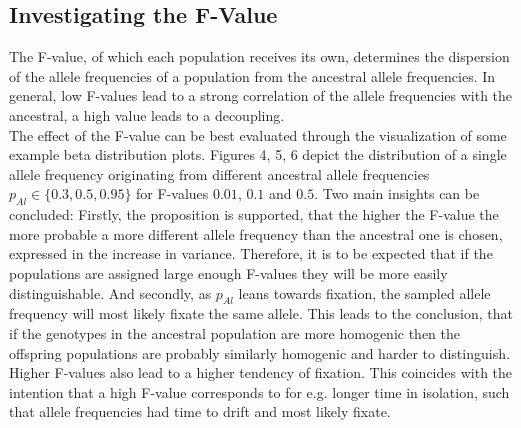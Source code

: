 \documentclass[a4paper, 11pt]{article}
\begin{document}
\subsection{Investigating the F-Value}
The F-value, of which each population receives its own, determines the dispersion of the allele frequencies of a population from the ancestral allele frequencies. In general, low F-values lead to a strong correlation of the allele frequencies with the ancestral, a high value leads to a decoupling.\\
The effect of the F-value can be best evaluated through the visualization of some example beta distribution plots. Figures 4, 5, 6 depict the distribution of a single allele frequency originating from different ancestral allele frequencies $p_{Al} \in \{0.3, 0.5, 0.95\}$ for F-values $0.01$, $0.1$ and $0.5$. Two main insights can be concluded: Firstly, the proposition is supported, that the higher the F-value the more probable a more different allele frequency than the ancestral one is chosen, expressed in the increase in variance. Therefore, it is to be expected that if the populations are assigned large enough F-values they will be more easily distinguishable. And secondly, as $p_{Al}$ leans towards fixation, the sampled allele frequency will most likely fixate the same allele. This leads to the conclusion, that if the genotypes in the ancestral population are more homogenic then the offspring populations are probably similarly homogenic and harder to distinguish. Higher F-values also lead to a higher tendency of fixation. This coincides with the intention that a high F-value corresponds to for e.g. longer time in isolation, such that allele frequencies had time to drift and most likely fixate.\\
\end{document}
